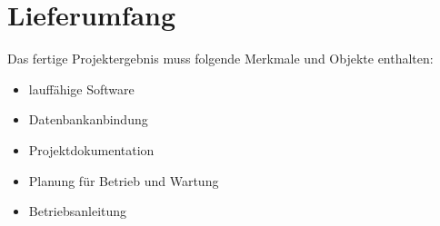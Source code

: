 \chapter{Lieferumfang}
Das fertige Projektergebnis muss folgende Merkmale und Objekte enthalten:
\begin{itemize}
\item lauffähige Software
\item Datenbankanbindung
\item Projektdokumentation
\item Planung für Betrieb und Wartung
\item Betriebsanleitung
\end{itemize}